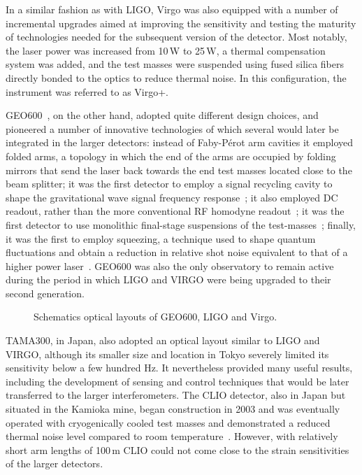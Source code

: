 In a similar fashion as with LIGO, Virgo was also equipped with a number of incremental upgrades aimed at improving the sensitivity and testing the maturity of technologies needed for the subsequent version of the detector.
Most notably, the laser power was increased from 10\,W to 25\,W, a thermal compensation system was added, and the test masses were suspended using fused silica fibers directly bonded to the optics to reduce thermal noise\cite{Lorenzini_2010}.
In this configuration, the instrument was referred to as Virgo+.

GEO600~\cite{Grote_2010}, on the other hand, adopted quite different design choices, and pioneered a number of innovative technologies of which several would later be integrated in the larger detectors:
instead of Faby-P\'{e}rot arm cavities it employed folded arms, a topology in which the end of the arms are occupied by folding mirrors that send the laser back towards the end test masses located close to the beam splitter;
it was the first detector to employ a signal recycling cavity to shape the gravitational wave signal frequency response~\cite{Willke_2002};
it also employed DC readout, rather than the more conventional RF homodyne readout~\cite{DCreadout};
it was the first detector to use monolithic final-stage suspensions of the test-masses~\cite{Plissi_2000};
finally, it was the first to employ squeezing, a technique used to shape quantum fluctuations and obtain a reduction in relative shot noise equivalent to that of a higher power laser~\cite{Grote_2013}.
GEO600 was also the only observatory to remain active during the period in which LIGO and VIRGO were being upgraded to their second generation.
\begin{figure}[htb]
	\caption{\label{fig:opticallayouts}Schematics optical layouts of GEO600, LIGO and Virgo.}
\end{figure}


TAMA300\cite{Ando_2002}, in Japan, also adopted an optical layout similar to LIGO and VIRGO, although its smaller size and location in Tokyo severely limited its sensitivity below a few hundred Hz.
It nevertheless provided many useful results, including the development of sensing and control techniques that would be later transferred to the larger interferometers. 
The CLIO detector, also in Japan but situated in the Kamioka mine, began construction in 2003 and was eventually operated with cryogenically cooled test masses and demonstrated a reduced thermal noise level compared to room temperature~\cite{Uchiyama_2012}. However, with relatively short arm lengths of 100\,m CLIO could not come close to the strain sensitivities of the larger detectors.

